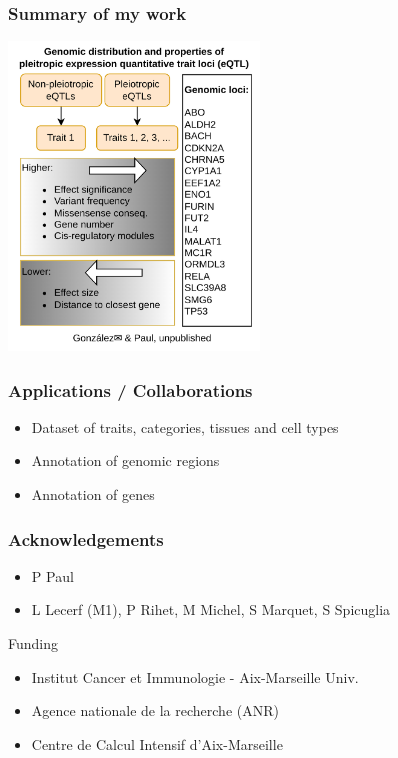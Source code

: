 \documentclass{beamer}
\begin{document}
    \begin{frame}
        \frametitle{Summary of my work}

        \begin{center}
            \includegraphics[width=0.5\textwidth]{fig/graphical_abstract.drawio.png}
        \end{center}

    \end{frame}

    \begin{frame}
        \frametitle{Applications / Collaborations}

        \begin{itemize}
            \item Dataset of traits, categories, tissues and cell types
            \item Annotation of genomic regions
            \item Annotation of genes
        \end{itemize}

    \end{frame}

    \begin{frame}
        \frametitle{Acknowledgements}

        \begin{itemize}
            \item P Paul
            \item L Lecerf (M1), P Rihet, M Michel, S Marquet, S Spicuglia
        \end{itemize}
%
        \vfill
%
        Funding
%
        \begin{itemize}
            \item Institut Cancer et Immunologie - Aix-Marseille Univ.
            \item Agence nationale de la recherche (ANR)
            \item Centre de Calcul Intensif d'Aix-Marseille
        \end{itemize}

    \end{frame}
\end{document}
